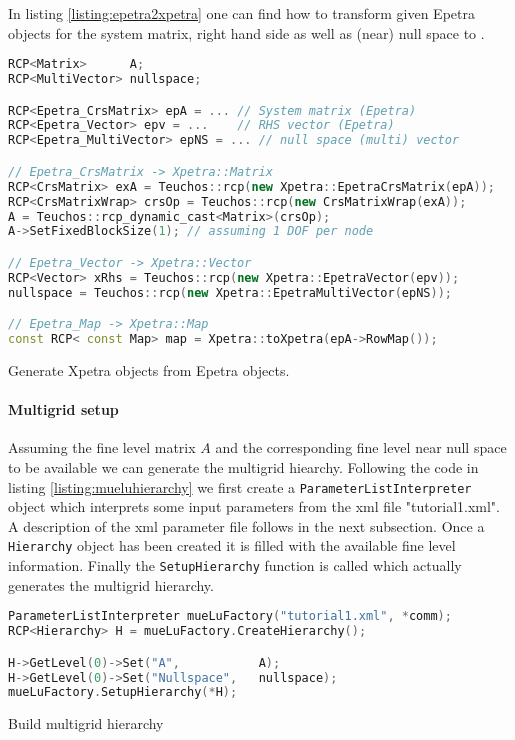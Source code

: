 In listing \ref{listing:epetra2xpetra} one can find how to transform given Epetra objects for the system matrix, right hand side as well as (near) null space to \Xpetra.
\begin{Listing} 
\begin{center} 
\begin{lstlisting}[language=C++,label=listing:epetra2xpetra]
RCP<Matrix>      A;
RCP<MultiVector> nullspace;

RCP<Epetra_CrsMatrix> epA = ... // System matrix (Epetra)
RCP<Epetra_Vector> epv = ...    // RHS vector (Epetra)
RCP<Epetra_MultiVector> epNS = ... // null space (multi) vector

// Epetra_CrsMatrix -> Xpetra::Matrix
RCP<CrsMatrix> exA = Teuchos::rcp(new Xpetra::EpetraCrsMatrix(epA));
RCP<CrsMatrixWrap> crsOp = Teuchos::rcp(new CrsMatrixWrap(exA));
A = Teuchos::rcp_dynamic_cast<Matrix>(crsOp);
A->SetFixedBlockSize(1); // assuming 1 DOF per node

// Epetra_Vector -> Xpetra::Vector
RCP<Vector> xRhs = Teuchos::rcp(new Xpetra::EpetraVector(epv));
nullspace = Teuchos::rcp(new Xpetra::EpetraMultiVector(epNS));

// Epetra_Map -> Xpetra::Map
const RCP< const Map> map = Xpetra::toXpetra(epA->RowMap());
\end{lstlisting}
\caption{Generate Xpetra objects from Epetra objects.} 
\label{listing:epetra2xpetra}
\end{center}
\end{Listing}

\paragraph{Multigrid setup}
Assuming the fine level matrix $A$ and the corresponding fine level near null space to be available we can generate the multigrid hiearchy. Following the code in listing \ref{listing:mueluhierarchy} we first create a \verb|ParameterListInterpreter| object which interprets some input parameters from the xml file "tutorial1.xml". A description of the xml parameter file follows in the next subsection.
Once a \verb|Hierarchy| object has been created it is filled with the available fine level information. Finally the \verb|SetupHierarchy| function is called which actually generates the multigrid hierarchy.
\begin{Listing} 
\begin{center} 
\begin{lstlisting}[language=C++,label=listing:epetra2xpetra]
ParameterListInterpreter mueLuFactory("tutorial1.xml", *comm);
RCP<Hierarchy> H = mueLuFactory.CreateHierarchy();

H->GetLevel(0)->Set("A",           A);
H->GetLevel(0)->Set("Nullspace",   nullspace);
mueLuFactory.SetupHierarchy(*H);
\end{lstlisting}
\caption{Build multigrid hierarchy} 
\label{listing:mueluhierarchy}
\end{center}
\end{Listing}

